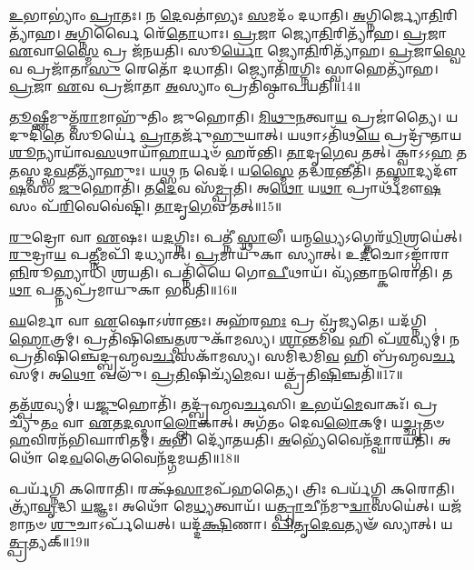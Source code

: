 \-\ul{𑌉}\-𑌭𑌾𑌭𑍍𑌯𑌾𑌂॑ \ul{𑌪𑍍𑌰𑌾}\-𑌤𑌃।
𑌨 \ul{𑌦𑍇}\-𑌵𑌤𑌾॑𑌭𑍍𑌯𑌃 \ul{𑌸}\-𑌮𑌦𑌂᳴ 𑌦𑌧𑌾𑌤𑌿।
\-\ul{𑌅}\-𑌗𑍍𑌨𑌿𑌰𑍍𑌜𑍍𑌯𑍋\-\ul{𑌤𑌿}\-\-𑌰𑌿𑌤𑍍𑌯𑌾᳴𑌹।
\-\ul{𑌅}\-𑌗𑍍𑌨𑌿𑌰𑍍𑌵𑍈 𑌰𑍇᳴\-\ul{𑌤𑍋}\-𑌧𑌾𑌃।
\-\ul{𑌪𑍍𑌰}\-𑌜𑌾 𑌜𑍍𑌯𑍋\-\ul{𑌤𑌿}\-𑌰𑌿𑌤𑍍𑌯𑌾᳴𑌹।
\-\ul{𑌪𑍍𑌰}\-𑌜𑌾 \ul{𑌏}\-𑌵𑌾\-\ul{𑌸𑍍𑌮𑍈} 𑌪𑍍𑌰 𑌜᳴𑌨𑌯𑌤𑌿।
𑌸𑍂\-\ul{𑌰𑍍𑌯𑍋} 𑌜𑍍𑌯𑍋\-\ul{𑌤𑌿}\-𑌰𑌿𑌤𑍍𑌯𑌾᳴𑌹।
\-\ul{𑌪𑍍𑌰}\-𑌜𑌾\-\ul{𑌸𑍍𑌵𑍇}\-𑌵 𑌪𑍍𑌰𑌜𑌾᳴𑌤𑌾\-\ul{𑌸𑍁} 𑌰𑍇𑌤𑍋᳴ 𑌦𑌧𑌾𑌤𑌿।
𑌜𑍍𑌯𑍋𑌤𑌿᳴\-\ul{𑌰}\-𑌗𑍍𑌨𑌿𑌃 𑌸𑍍𑌵𑌾𑌹𑍇𑌤𑍍𑌯𑌾᳴𑌹।
\-\ul{𑌪𑍍𑌰}\-𑌜𑌾 \ul{𑌏}\-𑌵 𑌪𑍍𑌰𑌜𑌾᳴𑌤𑌾 \ul{𑌅}\-𑌸𑍍𑌯𑌾𑌂 𑌪𑍍𑌰𑌤𑌿᳴\-𑌷𑍍𑌠𑌾𑌪𑌯𑌤𑌿॥14॥

\-\ul{𑌤𑍂}\-𑌷𑍍𑌣𑍀𑌮𑍁𑌤𑍍𑌤᳴\-\ul{𑌰𑌾}\-𑌮𑌾𑌹𑍁᳴𑌤𑌿𑌂 𑌜𑍁𑌹𑍋𑌤𑌿।
\-\ul{𑌮𑌿}\-\-\ul{𑌥𑍁}\-\-\ul{𑌨}\-𑌤𑍍𑌵𑌾\-\ul{𑌯} 𑌪𑍍𑌰𑌜𑌾॑𑌤𑍍𑌯𑍈।
𑌯𑌦𑍁𑌦𑌿᳴\-\ul{𑌤𑍇} 𑌸𑍂𑌰𑍍𑌯𑍇॑ \ul{𑌪𑍍𑌰𑌾}\-𑌤𑌰𑍍𑌜𑍁᳴\-\ul{𑌹𑍁}\-𑌯𑌾𑌤𑍍।
𑌯𑌥𑌾𑌽𑌤𑌿᳴𑌥\-\ul{𑌯𑍇} 𑌪𑍍𑌰𑌦𑍍𑌰𑍁᳴𑌤𑌾𑌯 \ul{𑌶𑍂}\-𑌨𑍍𑌯𑌾𑌯𑌾᳴𑌵\-\ul{𑌸}\-𑌥𑌾𑌯𑌾᳴\-\ul{𑌹𑌾}\-𑌰𑍍𑌯𑍞᳴ 𑌹𑌰᳴𑌨𑍍𑌤𑌿।
\-\ul{𑌤𑌾}\-𑌦𑍃\-\ul{𑌗𑍇}\-𑌵 𑌤𑌤𑍍।
𑌕𑍍𑌵𑌾𑌽𑌽\-\ul{𑌹} 𑌤\-\ul{𑌤}\-𑌸𑍍𑌤𑌦𑍍𑌭\-\ul{𑌵}\-𑌤𑍀𑌤𑍍𑌯𑌾᳴𑌹𑍁𑌃।
𑌯𑌥𑍍𑌸 𑌨 𑌵𑍇𑌦᳴।
𑌯\-\ul{𑌸𑍍𑌮𑍈} 𑌤𑌦𑍍𑌧\-\ul{𑌰}\-𑌨𑍍𑌤𑍀𑌤𑌿᳴।
𑌤\-\ul{𑌸𑍍𑌮𑌾}\-𑌦𑍍𑌯𑌦𑍗᳴\-\ul{𑌷}\-𑌸𑌂 \ul{𑌜𑍁}\-𑌹𑍋𑌤𑌿᳴।
𑌤\-\ul{𑌦𑍇}\-𑌵 𑌸᳴\-\ul{𑌮𑍍𑌪𑍍𑌰}\-𑌤𑌿।
𑌅\-\ul{𑌥𑍋} 𑌯\-\ul{𑌥𑌾} 𑌪𑍍𑌰𑌾𑌰𑍍𑌥᳴𑌮𑍗\-\ul{𑌷}\-𑌸𑌂 𑌪᳴\-\ul{𑌰𑌿}\-𑌵𑍇𑌵𑍇॑𑌷𑍍𑌟𑌿।
\-\ul{𑌤𑌾}\-𑌦𑍃\-\ul{𑌗𑍇}\-𑌵 𑌤𑌤𑍍॥15॥\anuvakamend[\-\ul{𑌅}\-\-\ul{𑌮𑍃}\-\-\ul{𑌷𑍍𑌟} \ul{𑌵𑌿}\-\-\ul{𑌚𑌿}\-𑌕𑌿𑌥𑍍𑌸᳴\-\ul{𑌤𑌿} 𑌜𑍁𑌹𑍍𑌵᳴\-\ul{𑌤𑍍𑌯}\-𑌜𑌾𑌮᳴\-𑌸𑍃𑌜𑌤𑌾𑌗𑍍𑌨𑌿\-\ul{𑌹𑍋}\-𑌤𑍍𑌰𑍞 𑌸𑍂𑌰𑍍𑌯𑌾᳴𑌯 \ul{𑌪𑍍𑌰𑌾}\-𑌤\-\ul{𑌰𑍍𑌜𑍁}\-𑌹𑍋\-\ul{𑌤𑌿} 𑌜𑍁𑌹𑍍𑌵᳴𑌤𑌿 \ul{𑌸}\-𑌮𑍍𑌪𑌦𑍍𑌯𑍇᳴𑌤𑍇 𑌹𑍂𑌯𑌤𑍇 𑌸𑍍𑌥𑌾𑌪𑌯𑌤𑌿 𑌸\-\ul{𑌮𑍍𑌪𑍍𑌰}\-𑌤𑌿 𑌦𑍍𑌵𑍇 𑌚᳴]

\-\ul{𑌰𑍁}\-𑌦𑍍𑌰𑍋 𑌵𑌾 \ul{𑌏}\-𑌷𑌃।
𑌯\-\ul{𑌦}\-𑌗𑍍𑌨𑌿𑌃।
𑌪𑌤𑍍𑌨𑍀॑ \ul{𑌸𑍍𑌥𑌾}\-𑌲𑍀।
𑌯𑌨𑍍𑌮\-\ul{𑌧𑍍𑌯𑍇}\-\-𑌽𑌗𑍍𑌨𑍇𑌰᳴\-\ul{𑌧𑌿}\-𑌶𑍍𑌰𑌯𑍇॑𑌤𑍍।
\-\ul{𑌰𑍁}\-𑌦𑍍𑌰𑌾\-\ul{𑌯} 𑌪\-\ul{𑌤𑍍𑌨𑍀}\-𑌮𑌪𑌿᳴ 𑌦𑌧𑍍𑌯𑌾𑌤𑍍।
\-\ul{𑌪𑍍𑌰}\-𑌮𑌾𑌯𑍁᳴𑌕𑌾 𑌸𑍍𑌯𑌾𑌤𑍍।
𑌉\-\ul{𑌦𑍀}\-𑌚𑍋\-𑌽𑌙𑍍𑌗𑌾᳴𑌰𑌾\-\ul{𑌨𑍍𑌨𑌿}\-𑌰𑍂𑌹𑍍𑌯𑌾𑌧𑌿᳴ 𑌶𑍍𑌰𑌯𑌤𑌿।
𑌪𑌤𑍍𑌨𑌿᳴𑌯𑍈 𑌗𑍋\-\ul{𑌪𑍀}\-𑌥𑌾𑌯᳴।
𑌵𑍍𑌯᳴𑌨𑍍𑌤𑌾𑌨𑍍𑌕𑌰𑍋𑌤𑌿।
𑌤\-\ul{𑌥𑌾} 𑌪𑌤𑍍𑌨𑍍𑌯𑌪𑍍𑌰᳴𑌮𑌾𑌯𑍁𑌕𑌾 𑌭𑌵𑌤𑌿॥16॥

\-\ul{𑌘}\-𑌰𑍍𑌮𑍋 𑌵𑌾 \ul{𑌏}\-𑌷𑍋\-𑌽𑌶𑌾॑𑌨𑍍𑌤𑌃।
𑌅𑌹᳴𑌰\-\ul{𑌹𑌃} 𑌪𑍍𑌰 𑌵𑍃᳴𑌜𑍍𑌯𑌤𑍇।
𑌯𑌦᳴𑌗𑍍𑌨𑌿\-\ul{𑌹𑍋}\-𑌤𑍍𑌰𑌮𑍍।
𑌪𑍍𑌰𑌤𑌿᳴\-𑌷𑌿𑌞𑍍𑌚𑍇\-\ul{𑌤𑍍𑌪}\-𑌶𑍁𑌕𑌾᳴𑌮𑌸𑍍𑌯।
\-\ul{𑌶𑌾}\-𑌨𑍍𑌤𑌮𑌿᳴\-\ul{𑌵} 𑌹𑌿 𑌪᳴\-\ul{𑌶}\-𑌵𑍍𑌯𑌮𑍍॑।
𑌨 𑌪𑍍𑌰𑌤𑌿᳴\-𑌷𑌿𑌞𑍍𑌚𑍇𑌦𑍍𑌬𑍍𑌰𑌹𑍍𑌮𑌵\-\ul{𑌰𑍍𑌚}\-𑌸𑌕𑌾᳴𑌮𑌸𑍍𑌯।
𑌸𑌮𑌿᳴𑌦𑍍𑌧𑌮𑌿\-\ul{𑌵} 𑌹𑌿 𑌬𑍍𑌰᳴𑌹𑍍𑌮𑌵\-\ul{𑌰𑍍𑌚}\-𑌸𑌮𑍍।
𑌅\-\ul{𑌥𑍋} 𑌖𑌲𑍁᳴।
\-\ul{𑌪𑍍𑌰}\-\-\ul{𑌤𑌿}\-𑌷𑌿𑌚𑍍𑌯᳴\-\ul{𑌮𑍇}\-𑌵।
𑌯𑌤𑍍𑌪𑍍𑌰᳴𑌤𑌿\-\ul{𑌷𑌿}\-𑌞𑍍𑌚𑌤𑌿᳴॥17॥

𑌤𑌤𑍍𑌪᳴\-\ul{𑌶}\-𑌵𑍍𑌯𑌮𑍍॑।
𑌯\-\ul{𑌜𑍍𑌜𑍁}\-𑌹𑍋𑌤𑌿᳴।
𑌤𑌦𑍍𑌬𑍍𑌰᳴𑌹𑍍𑌮𑌵\-\ul{𑌰𑍍𑌚}\-𑌸𑌿।
\-\ul{𑌉}\-𑌭𑌯᳴\-\ul{𑌮𑍇}\-𑌵𑌾𑌕𑌃᳴।
𑌪𑍍𑌰𑌚𑍍𑌯𑍁᳴\-\ul{𑌤𑌂} 𑌵𑌾 \ul{𑌏}\-𑌤\-\ul{𑌦}\-𑌸𑍍𑌮𑌾\-\ul{𑌲𑍍𑌲𑍋}\-𑌕𑌾𑌤𑍍।
𑌅𑌗᳴𑌤𑌂 𑌦𑍇𑌵\-\ul{𑌲𑍋}\-𑌕𑌮𑍍।
𑌯\-\ul{𑌚𑍍𑌛𑍃}\-𑌤𑍞 \ul{𑌹}\-𑌵𑌿𑌰𑌨᳴𑌭𑌿𑌘𑌾𑌰𑌿𑌤𑌮𑍍।
\-\ul{𑌅}\-𑌭𑌿 𑌦𑍍𑌯𑍋᳴𑌤𑌯𑌤𑌿।
\-\ul{𑌅}\-𑌭𑍍𑌯𑍇᳴𑌵𑍈𑌨᳴𑌦𑍍\mbox{}𑌘𑌾𑌰𑌯𑌤𑌿।
𑌅𑌥𑍋᳴ 𑌦𑍇\-\ul{𑌵}\-𑌤𑍍𑌰𑍈𑌵𑍈𑌨᳴𑌦𑍍𑌗𑌮𑌯𑌤𑌿॥18॥

𑌪𑌰𑍍𑌯᳴𑌗𑍍𑌨𑌿 𑌕𑌰𑍋𑌤𑌿।
𑌰𑌕𑍍𑌷᳴\-\ul{𑌸𑌾}\-𑌮𑌪᳴𑌹𑌤𑍍𑌯𑍈।
𑌤𑍍𑌰𑌿𑌃 𑌪𑌰𑍍𑌯᳴𑌗𑍍𑌨𑌿 𑌕𑌰𑍋𑌤𑌿।
𑌤𑍍𑌰𑍍𑌯𑌾᳴\-\ul{𑌵𑍃}\-𑌦𑍍𑌧𑌿 \ul{𑌯}\-𑌜𑍍𑌞𑌃।
𑌅𑌥𑍋᳴ 𑌮𑍇\-\ul{𑌧𑍍𑌯}\-𑌤𑍍𑌵𑌾𑌯᳴।
𑌯\-\ul{𑌤𑍍𑌪𑍍𑌰𑌾}\-𑌚𑍀𑌨᳴𑌮𑍁\-\ul{𑌦𑍍𑌵𑌾}\-𑌸𑌯𑍇॑𑌤𑍍।
𑌯𑌜᳴𑌮𑌾𑌨𑍞 \ul{𑌶𑍁}\-𑌚𑌾\-𑌽𑌰𑍍𑌪᳴𑌯𑍇𑌤𑍍।
𑌯𑌦𑍍𑌦᳴\-\ul{𑌕𑍍𑌷𑌿}\-𑌣𑌾।
\-\ul{𑌪𑌿}\-\-\ul{𑌤𑍃}\-\-\ul{𑌦𑍇}\-\-\ul{𑌵}\-𑌤𑍍𑌯𑍟᳴ 𑌸𑍍𑌯𑌾𑌤𑍍।
𑌯\-\ul{𑌤𑍍𑌪𑍍𑌰}\-𑌤𑍍𑌯𑌕𑍍॥19॥

